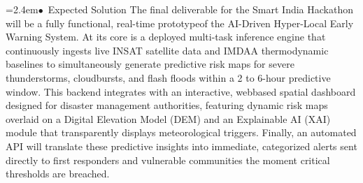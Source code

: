 \documentclass[10pt,a4paper]{article}
\begin{document}
\begin{tcolorbox}[pscard, title={"\textbf{SIH26077} \quad $\vert$ \quad AI-Driven Hyper-Local Early Warning System for Severe Weather Nowcasting}]
\noindent\hspace*{1.2em}\hangindent=2.4em\textcolor{sihblue}{$\bullet$}~\small Expected Solution The final deliverable for the Smart India Hackathon will be a fully functional, real-time prototypeof the AI-Driven Hyper-Local Early Warning System. At its core is a deployed multi-task inference engine that continuously ingests live INSAT satellite data and IMDAA thermodynamic baselines to simultaneously generate predictive risk maps for severe thunderstorms, cloudbursts, and flash floods within a 2 to 6-hour predictive window. This backend integrates with an interactive, webbased spatial dashboard designed for disaster management authorities, featuring dynamic risk maps overlaid on a Digital Elevation Model (DEM) and an Explainable AI (XAI) module that transparently displays meteorological triggers. Finally, an automated API will translate these predictive insights into immediate, categorized alerts sent directly to first responders and vulnerable communities the moment critical thresholds are breached.\par\vspace{0.05cm}

\end{tcolorbox}
\vspace{0.4cm}
{}
\end{document}
